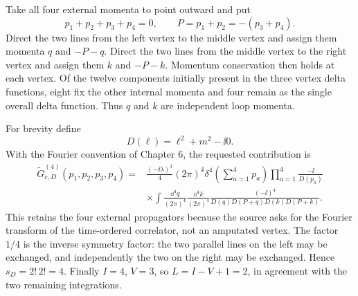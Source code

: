 \begin{enumerate}
Take all four external momenta to point outward and put
\[
 p_1+p_2+p_3+p_4=0,
 \qquad P=p_1+p_2=-(p_3+p_4).
\]
Direct the two lines from the left vertex to the middle vertex and assign
them momenta \(q\) and \(-P-q\).  Direct the two lines from the middle
vertex to the right vertex and assign them \(k\) and \(-P-k\).  Momentum
conservation then holds at each vertex.  Of the twelve components initially
present in the three vertex delta functions, eight fix the other internal
momenta and four remain as the single overall delta function.  Thus \(q\)
and \(k\) are independent loop momenta.

For brevity define
\[
 D(\ell)=\ell^2+m^2-\ii0.
\]
With the Fourier convention of Chapter 6, the requested contribution is
\[
 \begin{split}
 \widetilde G^{(4)}_{c,D}(p_1,p_2,p_3,p_4)
 ={}&\frac{(-\ii\lambda)^3}{4}(2\pi)^4
 \delta^4\!\left(\sum_{a=1}^4p_a\right)
 \prod_{a=1}^4\frac{-\ii}{D(p_a)}
 \\
 &\times\int\frac{\dd^4q}{(2\pi)^4}\frac{\dd^4k}{(2\pi)^4}
 \frac{(-\ii)^4}{D(q)D(P+q)D(k)D(P+k)}.
 \end{split}
\]
This retains the four external propagators because the source asks for the
Fourier transform of the time-ordered correlator, not an amputated vertex.
The factor \(1/4\) is the inverse symmetry factor: the two parallel lines on
the left may be exchanged, and independently the two on the right may be
exchanged.  Hence
\(s_D=2!\,2!=4\).  Finally \(I=4\), \(V=3\), so
\(L=I-V+1=2\), in agreement with the two remaining integrations.


\end{enumerate}

